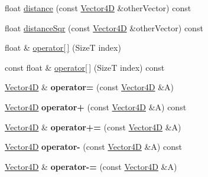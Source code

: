 \begin{DoxyCompactItemize}
float \hyperlink{classdrider_s_d_k_1_1_vector4_d_a3aa1ea1f8fd24f6a1bc5475158c4ded7}{distance} (const \hyperlink{classdrider_s_d_k_1_1_vector4_d}{Vector4D} \&other\+Vector) const
\item 
float \hyperlink{classdrider_s_d_k_1_1_vector4_d_ae470e090d587784df55ed6dce94f57fc}{distance\+Sqr} (const \hyperlink{classdrider_s_d_k_1_1_vector4_d}{Vector4D} \&other\+Vector) const
\item 
float \& \hyperlink{classdrider_s_d_k_1_1_vector4_d_a22777557bf66b8adeb50f24f2943fc66}{operator\mbox{[}$\,$\mbox{]}} (SizeT index)
\item 
const float \& \hyperlink{classdrider_s_d_k_1_1_vector4_d_a6da3ce7013d8b4fef78986433af25971}{operator\mbox{[}$\,$\mbox{]}} (SizeT index) const
\item 
\mbox{\label{classdrider_s_d_k_1_1_vector4_d_a98eb14acc45ecbb0214fdaa25923aa9e}} 
\hyperlink{classdrider_s_d_k_1_1_vector4_d}{Vector4D} \& {\bfseries operator=} (const \hyperlink{classdrider_s_d_k_1_1_vector4_d}{Vector4D} \&A)
\item 
\mbox{\label{classdrider_s_d_k_1_1_vector4_d_a2c7fbcc833cfa0fb776a9231434293d0}} 
\hyperlink{classdrider_s_d_k_1_1_vector4_d}{Vector4D} {\bfseries operator+} (const \hyperlink{classdrider_s_d_k_1_1_vector4_d}{Vector4D} \&A) const
\item 
\mbox{\label{classdrider_s_d_k_1_1_vector4_d_afb27b2c43a38df5767f1e0a9d2b77fc7}} 
\hyperlink{classdrider_s_d_k_1_1_vector4_d}{Vector4D} \& {\bfseries operator+=} (const \hyperlink{classdrider_s_d_k_1_1_vector4_d}{Vector4D} \&A)
\item 
\mbox{\label{classdrider_s_d_k_1_1_vector4_d_a1f3b703db359083ab5061689b4721b9f}} 
\hyperlink{classdrider_s_d_k_1_1_vector4_d}{Vector4D} {\bfseries operator-\/} (const \hyperlink{classdrider_s_d_k_1_1_vector4_d}{Vector4D} \&A) const
\item 
\mbox{\label{classdrider_s_d_k_1_1_vector4_d_ac2b73c4fb5009b248229b08bbf8a7162}} 
\hyperlink{classdrider_s_d_k_1_1_vector4_d}{Vector4D} \& {\bfseries operator-\/=} (const \hyperlink{classdrider_s_d_k_1_1_vector4_d}{Vector4D} \&A)
\item 

\end{DoxyCompactItemize}
